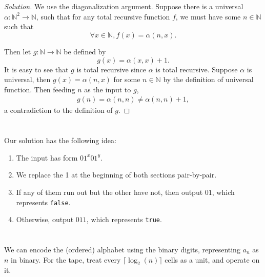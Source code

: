 \documentclass{article}
\title{\mytitle}
\author{\myname}
\date{\today}
\theoremstyle{plain}
\newcommand{\N}{\mathbb{N}}
\begin{document}
\maketitle
\section{}
\begin{proof}[Solution]
We use the diagonalization argument. Suppose there is a universal $\alpha:\N^{2}\to\N$,
such that for any total recursive function $f$, we must have some $n\in\N$ such
that \[\forall x\in\N, f(x) = \alpha(n, x).\]

Then let $g:\N\to\N$ be defined by \[g(x) = \alpha(x, x) + 1.\] It is easy to see that
$g$ is total recursive since $\alpha$ is total recursive. Suppose $\alpha$ is universal,
then $g(x) = \alpha(n, x)$ for some $n\in\N$ by the definition of universal function.
Then feeding $n$ as the input to $g$,
\begin{align*}
  g(n) = \alpha(n,n) \ne \alpha(n,n) + 1,
\end{align*}
a contradiction to the definition of $g$.
\end{proof}

\section{}
\subsubsection{}
Our solution has the following idea:
\begin{enumerate}
  \item The input has form $01^{x}01^{y}$.
  \item We replace the 1 at the beginning of both sections pair-by-pair.
  \item If any of them run out but the other have not, then output $01$, which
        represents \verb|false|.
  \item Otherwise, output $011$, which represents \verb|true|.
\end{enumerate}



\section{}
\subsubsection{}
We can encode the (ordered) alphabet using the binary digits, representing
$a_{n}$ as $n$ in binary. For the tape, treat every $\lceil\log_{2}(n)\rceil$ cells as a
unit, and operate on it.
\end{document}
